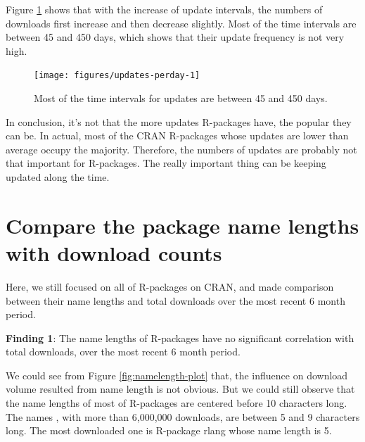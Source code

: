 \documentclass[
]{book}
\newenvironment{discovery}[1]{%
  \begin{tcolorbox}[colback=blue!30,colframe=blue!80!black]#1}{\end{tcolorbox}}
\begin{document}
Figure \ref{fig:updates-perday} shows that with the increase of update intervals, the numbers of downloads first increase and then decrease slightly. Most of the time intervals are between 45 and 450 days, which shows that their update frequency is not very high.



\begin{figure}

{\centering \texttt{[image: figures/updates-perday-1]} 

}

\caption{Most of the time intervals for updates are between 45 and 450 days.}\label{fig:updates-perday}
\end{figure}

In conclusion, it's not that the more updates R-packages have, the popular they can be. In actual, most of the CRAN R-packages whose updates are lower than average occupy the majority. Therefore, the numbers of updates are probably not that important for R-packages. The really important thing can be keeping updated along the time.

\hypertarget{compare-the-package-name-lengths-with-download-counts}{%
\section{Compare the package name lengths with download counts}\label{compare-the-package-name-lengths-with-download-counts}}

Here, we still focused on all of R-packages on CRAN, and made comparison between their name lengths and total downloads over the most recent 6 month period.

\begin{discovery}
\textbf{Finding 1}: The name lengths of R-packages have no significant
correlation with total downloads, over the most recent 6 month period.
\end{discovery}

We could see from Figure \ref{fig:namelength-plot} that, the influence on download volume resulted from name length is not obvious. But we could still observe that the name lengths of most of R-packages are centered before 10 characters long. The names , with more than 6,000,000 downloads, are between 5 and 9 characters long. The most downloaded one is R-package rlang whose name length is 5.
\end{document}
